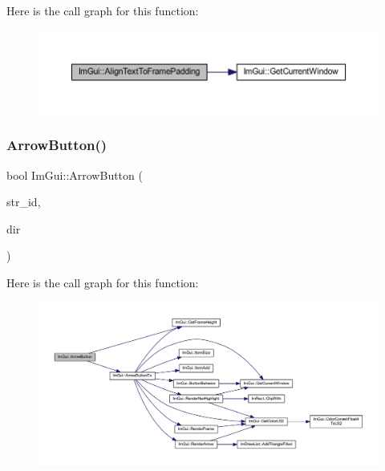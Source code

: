 Here is the call graph for this function\+:
\nopagebreak
\begin{figure}[H]
\begin{center}
\leavevmode
\includegraphics[width=350pt]{namespace_im_gui_ae14be3a3bec106de7c91aaa2a9a558a1_cgraph}
\end{center}
\end{figure}
\mbox{\label{namespace_im_gui_ad2bc397a02d5e4b8a14360d89abc6242}} 
\subsubsection{\texorpdfstring{Arrow\+Button()}{ArrowButton()}}
{\footnotesize\ttfamily bool Im\+Gui\+::\+Arrow\+Button (\begin{DoxyParamCaption}\item[{const char $\ast$}]{str\+\_\+id,  }\item[{\mbox{\hyperlink{imgui_8h_a874086389bc27cc9647118d22a806403}{Im\+Gui\+Dir}}}]{dir }\end{DoxyParamCaption})}

Here is the call graph for this function\+:
\nopagebreak
\begin{figure}[H]
\begin{center}
\leavevmode
\includegraphics[width=350pt]{namespace_im_gui_ad2bc397a02d5e4b8a14360d89abc6242_cgraph}
\end{center}
\end{figure}
\mbox{\label{namespace_im_gui_af8efa3144c85104fbb0aa2e7bc6a6069}} 
